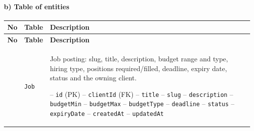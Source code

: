 \paragraph*{b) Table of entities}\nopagebreak[4]
\begin{center}\nopagebreak[4]
\small\sloppy
\begin{longtable}{|C{0.8cm}|L{3.8cm}|p{10.0cm}|}
\hline
{}\textbf{No} & \textbf{Table} & \textbf{Description} \\* \hline
\endfirsthead
\hline
{}\textbf{No} & \textbf{Table} & \textbf{Description} \\* \hline
\endhead
\hline\endfoot
\hline{} & \texttt{Job} & Job posting: slug, title, description, budget range and type, hiring type, positions required/filled, deadline, expiry date, status and the owning client.\par\smallskip
\hspace*{1em}-- \texttt{id} (PK) \newline
\hspace*{1em}-- \texttt{client\allowbreak Id} (FK) \newline
\hspace*{1em}-- \texttt{title} \newline
\hspace*{1em}-- \texttt{slug} \newline
\hspace*{1em}-- \texttt{description} \newline
\hspace*{1em}-- \texttt{budget\allowbreak Min} \newline
\hspace*{1em}-- \texttt{budget\allowbreak Max} \newline
\hspace*{1em}-- \texttt{budget\allowbreak Type} \newline
\hspace*{1em}-- \texttt{deadline} \newline
\hspace*{1em}-- \texttt{status} \newline
\hspace*{1em}-- \texttt{expiry\allowbreak Date} \newline
\hspace*{1em}-- \texttt{created\allowbreak At} \newline
\hspace*{1em}-- \texttt{updated\allowbreak At} \newline

\end{longtable}
\end{center}
